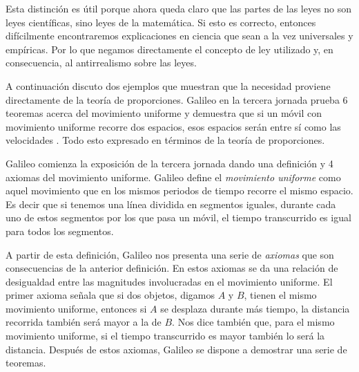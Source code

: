 Esta distinción es útil porque ahora queda claro que las partes de las leyes no son leyes científicas, sino leyes de la matemática.%
Si esto es correcto, entonces difícilmente encontraremos explicaciones en ciencia que sean a la vez universales y empíricas. Por lo que negamos directamente el concepto de ley utilizado y, en consecuencia, al antirrealismo sobre las leyes.


A continuación discuto dos ejemplos que muestran que la necesidad proviene directamente de la teoría de proporciones. Galileo en la tercera jornada prueba 6%
teoremas acerca del movimiento uniforme y demuestra que si un móvil con movimiento uniforme recorre dos espacios, esos espacios serán entre sí como las velocidades \cite[p. 215]{galtre}. Todo esto expresado en términos de la teoría de proporciones.

Galileo comienza la exposición de la tercera jornada dando una definición y 4 axiomas del movimiento uniforme. Galileo define el \textit{movimiento uniforme} como aquel movimiento que en los mismos periodos de tiempo recorre el mismo espacio. Es decir que si tenemos una línea dividida en segmentos iguales, durante cada uno de estos segmentos por los que pasa un móvil, el tiempo transcurrido es igual para todos los segmentos.

A partir de esta definición, Galileo nos presenta una serie de \textit{axiomas} que son consecuencias de la anterior definición. En estos axiomas se da una relación de desigualdad entre las magnitudes involucradas en el movimiento uniforme. El primer axioma señala que si dos objetos, digamos $A$ y $B$, tienen el mismo movimiento uniforme, entonces si $A$ se desplaza durante más tiempo, la distancia recorrida también será mayor a la de $B$. Nos dice también que, para el mismo movimiento uniforme, si el tiempo transcurrido es mayor también lo será la distancia. Después de estos axiomas, Galileo se dispone a demostrar una serie de teoremas.

